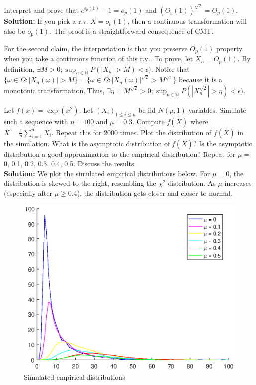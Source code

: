 \documentclass[11pt,letterpaper]{article}                  %
\begin{document}
\bigskip

\begin{problem}
Interpret and prove that $e^{o_p(1)} -1 = o_p(1)$ and $(O_p(1))^{\sqrt{2}} = O_p(1)$. \\

\textbf{Solution:} If you pick a r.v. $X = o_p(1)$, then a continuous transformation will also be $o_p(1)$. The proof is a straightforward consequence of CMT.

For the second claim, the interpretation is that you preserve $O_p(1)$ property when you take a continuous function of this r.v.. To prove, let $X_n = O_p(1)$. By definition, $\exists M>0 ; \sup_{n \in \mathbb{N}} P(|X_n|>M)<\epsilon)$. Notice that $\{\omega \in \Omega : |X_n(\omega)|>M\} = \{\omega \in \Omega : |X_n(\omega)|^{\sqrt{2}}>M^{\sqrt{2}}\}$ because it is a monotonic transformation. Thus, $\exists \eta = M^{\sqrt{2}}>0 ; \sup_{n \in \mathbb{N}} P(|X_n^{\sqrt{2}}|>\eta)<\epsilon)$.
\end{problem}

\bigskip

\begin{problem}
Let $f(x) = \exp (x^2)$.
Let $(X_i)_{1 \leq i \leq n}$ be iid $N(\mu,1)$ variables.
Simulate such a sequence with $n = 100$ and $\mu = 0.3$.
Compute $f (\bar{X})$ where $\bar{X} = \frac{1}{n} \sum_{i=1}^n X_i$.
Repeat this for 2000 times. Plot the distribution of $f (\bar{X})$ in the simulation.
What is the asymptotic distribution of $f (\bar{X})$?
Is the asymptotic distribution a good approximation to the empirical distribution?
Repeat for $\mu =$ 0, 0.1, 0.2, 0.3, 0.4, 0.5.
Discuss the results. \\

\textbf{Solution:}
We plot the simulated empirical distributions below.
For $\mu = 0$, the distribution is skewed to the right, resembling the $\chi^2$-distribution.
As $\mu$ increases (especially after $\mu \geq 0.4$), the distribution gets closer and closer to normal.

\begin{figure}[H]
  \centering
  \caption{Simulated empirical distributions}
  \includegraphics[scale=0.6]{prob12.eps}
\end{figure}
\end{problem}

\bigskip

\begin{problem}

\end{problem}
\end{document}
